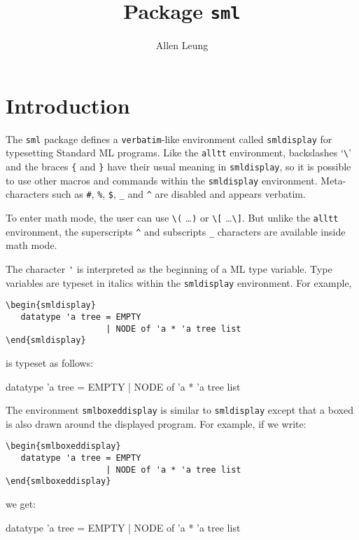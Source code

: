 \documentclass{article}
\title{Package {\tt sml}}
\author{Allen Leung}
\begin{document}
  \maketitle
\section{Introduction}
  The \verb|sml| package defines a \verb|verbatim|-like environment
called \verb|smldisplay|
for typesetting Standard ML programs.   
Like the \verb|alltt| environment, 
backslashes `\verb|\|' and the braces \verb|{|
and \verb|}| have their usual meaning in \verb|smldisplay|, 
so it is possible to use other
macros and commands within the \verb|smldisplay| environment.
Meta-characters such as \verb|#|, \verb|%|, 
\verb|$|, \verb|_| and \verb|^| are disabled and appears verbatim.  

To enter math mode, the user can use \verb|\(| \ldots \verb|)| or
\verb|\[| \ldots \verb|\]|.  But unlike the \verb|alltt| environment,
the superscripts \verb|^| and subscripts \verb|_| characters
are available inside math mode. 

The character \verb|'| is interpreted as the beginning of a ML 
type variable.  Type variables are typeset 
in italics within the \verb|smldisplay| environment.  For example, 
\begin{verbatim}
\begin{smldisplay} 
   datatype 'a tree = EMPTY
                    | NODE of 'a * 'a tree list
\end{smldisplay}
\end{verbatim}
is typeset as follows:
\begin{smldisplay} 
   datatype 'a tree = EMPTY 
                    | NODE of 'a * 'a tree list
\end{smldisplay}

The environment \verb|smlboxeddisplay| is similar to \verb|smldisplay|
except that a boxed is also drawn around the displayed program.
For example, if we write:
\begin{verbatim}
\begin{smlboxeddisplay} 
   datatype 'a tree = EMPTY 
                    | NODE of 'a * 'a tree list
\end{smlboxeddisplay}
\end{verbatim}
we get:
\begin{smlboxeddisplay} 
   datatype 'a tree = EMPTY 
                    | NODE of 'a * 'a tree list
\end{smlboxeddisplay}
\end{document}
